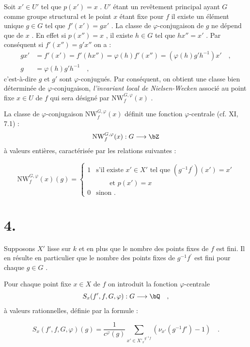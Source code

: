 Soit $x' \in U'$ tel que $p(x') = x$ . $U'$ étant un revêtement principal ayant $G$ comme groupe structural et le point $x$ étant fixe pour $f$ il existe un élément unique $g \in G$ tel que $f'(x') = gx'$ . La classe de $\varphi$-conjugaison de $g$ ne dépend que de $x$ . En effet si $p(x'') = x$ , il existe $h \in G$ tel que $hx'' = x'$ . Par conséquent si $f'(x'') = g'x''$ on a :
\begin{align*}
gx' &= f'(x') = f'(hx'') = \varphi(h)f'(x'') = (\varphi(h)g'h^{-1})x' \quad , \\
g &= \varphi(h)g'h^{-1} \quad ,
\end{align*}
c'est-à-dire $g$ et $g'$ sont $\varphi$-conjugués. Par conséquent, on obtient une classe bien déterminée de $\varphi$-conjugaison, \emph{l'invariant local de Nielsen-Wecken} associé au point fixe $x \in U$ de $f$ qui sera désigné par $\mathrm{NW}_{f}^{G,\varphi}(x)$ .

La classe de $\varphi$-conjugaison $\mathrm{NW}_{f}^{G,\varphi}(x)$ définit une fonction $\varphi$-centrale (cf. XI, 7.1) :
\[
\mathrm{NW}_{f}^{G,\varphi}(x) : G \longrightarrow \bZ
\]
à valeurs entières, caractérisée par les relations suivantes :

\begin{equation}\tag{3.1}
\mathrm{NW}_{f}^{G,\varphi}(x)(g) = \begin{cases} 1 &
\text{s'il existe } x' \in X' \text{ tel que } (g^{-1}f^{\prime})(x') = x' \\ & \qquad \text{et } p(x') = x \\ 0 & \text{sinon .} \end{cases}
\end{equation}

\section*{4.}

Supposons $X'$ lisse sur $k$ et en plus que le nombre des points fixes de $f$ est fini. Il en résulte en particulier que le nombre des points fixes de $g^{-1}f^{\prime}$ est fini pour chaque $g \in G$ .

Pour chaque point fixe $x \in X$ de $f$ on introduit la fonction $\varphi$-centrale
\[
S_x(f',f,G,\varphi) : G \longrightarrow \bQ \quad ,
\]
à valeurs rationnelles, définie par la formule :

\begin{equation}\tag{4.1}
S_x(f',f,G,\varphi)(g) = \frac{1}{c^\varphi(g)} \sum_{x' \in {X'_x}^{g^{-1}f}} (\nu_{x'}(g^{-1}f') - 1) \quad .
\end{equation}

